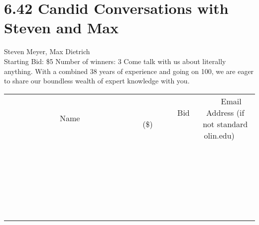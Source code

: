 \documentclass[11pt]{article}
\begin{document}
\section*{6.42 Candid Conversations with Steven and Max}
Steven Meyer, Max Dietrich
\\
Starting Bid: \$5
\newline
Number of winners: 3
\newline
Come talk with us about literally anything. With a combined 38 years of experience and going on 100, we are eager to share our boundless wealth of expert knowledge with you.
\\[6ex]
\begin{tabular}{c c c}
~~~~~~~~~~~~~Name~~~~~~~~~~~~~ & ~~~~~~~~~Bid (\$)~~~~~~~~~  & ~~~Email Address (if not standard olin.edu)~~~\\
 & & \\
\hline
 & & \\
\hline
 & & \\
\hline
 & & \\
\hline
 & & \\
\hline
 & & \\
\hline
 & & \\
\hline
 & & \\
\hline
 & & \\
\hline
 & & \\
\hline
 & & \\
\hline
 & & \\
\hline
 & & \\
\hline
 & & \\
\hline
 & & \\
\hline
 & & \\
\hline
 & & \\
\hline
 & & \\
\hline
 & & \\
\hline
 & & \\
\hline
 & & \\
\hline
 & & \\
\hline
 & & \\
\hline
 & & \\
\hline
 & & \\
\hline
 & & \\
\hline
\end{tabular}
\newpage
\end{document}
